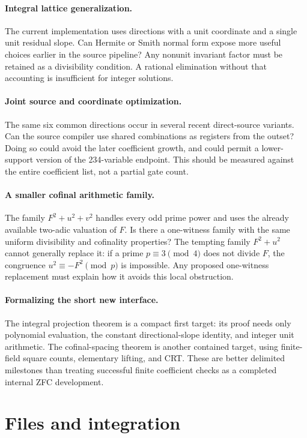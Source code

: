 \documentclass[10pt,letterpaper]{article}
\theoremstyle{definition}\newtheorem{remark}[theorem]{Remark}
\begin{document}
\paragraph{Integral lattice generalization.}
The current implementation uses directions with a unit coordinate and a
single unit residual slope. Can Hermite or Smith normal form expose more
useful choices earlier in the source pipeline? Any nonunit invariant
factor must be retained as a divisibility condition. A rational elimination
without that accounting is insufficient for integer solutions.

\paragraph{Joint source and coordinate optimization.}
The same six common directions occur in several recent direct-source
variants. Can the source compiler use shared combinations as registers
from the outset? Doing so could avoid the later coefficient growth, and
could permit a lower-support version of the 234-variable endpoint.
This should be measured against the entire coefficient list, not a
partial gate count.

\paragraph{A smaller cofinal arithmetic family.}
The family $F^2+u^2+v^2$ handles every odd prime power and uses the already
available two-adic valuation of $F$. Is there a one-witness family with the
same uniform divisibility and cofinality properties? The tempting family
$F^2+u^2$ cannot generally replace it: if a prime $p\equiv3\pmod4$ does
not divide $F$, the congruence $u^2\equiv-F^2\pmod p$ is impossible.
Any proposed one-witness replacement must explain how it avoids this
local obstruction.

\paragraph{Formalizing the short new interface.}
The integral projection theorem is a compact first target: its proof needs
only polynomial evaluation, the constant directional-slope identity, and
integer unit arithmetic. The cofinal-spacing theorem is another contained
target, using finite-field square counts, elementary lifting, and CRT.
These are better delimited milestones than treating successful finite
coefficient checks as a completed internal ZFC development.

\section{Files and integration}
\end{document}
